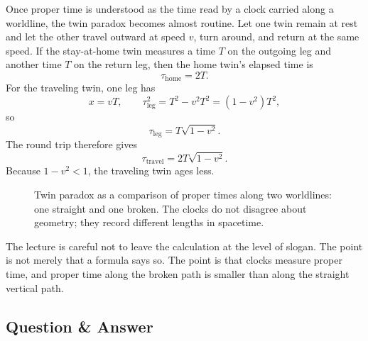 Once proper time is understood as the time read by a clock carried along a worldline, the twin paradox becomes almost routine. Let one twin remain at rest and let the other travel outward at speed \(v\), turn around, and return at the same speed. If the stay-at-home twin measures a time \(T\) on the outgoing leg and another time \(T\) on the return leg, then the home twin's elapsed time is
\begin{equation}
\tau_{\mathrm{home}} = 2T.
\end{equation}
For the traveling twin, one leg has
\begin{equation}
x=vT,
\qquad
\tau_{\mathrm{leg}}^2 = T^2 - v^2T^2 = (1-v^2)T^2,
\end{equation}
so
\begin{equation}
\tau_{\mathrm{leg}} = T\sqrt{1-v^2}.
\end{equation}
The round trip therefore gives
\begin{equation}
\tau_{\mathrm{travel}} = 2T\sqrt{1-v^2}.
\end{equation}
Because \(1-v^2<1\), the traveling twin ages less.

\begin{figure}[h]
\centering
{}
\caption{Twin paradox as a comparison of proper times along two worldlines: one straight and one broken. The clocks do not disagree about geometry; they record different lengths in spacetime.}
\end{figure}

The lecture is careful not to leave the calculation at the level of slogan. The point is not merely that a formula says so. The point is that clocks measure proper time, and proper time along the broken path is smaller than along the straight vertical path.

\subsection{Question \& Answer}


